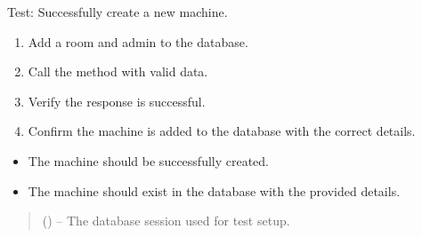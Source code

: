 \documentclass[letterpaper,10pt,english]{sphinxmanual}
\begin{document}
\begin{fulllineitems}
\label{\detokenize{test:test.test_machine.test_create_machine_success}}
\pysigstartsignatures
\pysiglinewithargsret
{}
{}
{}
\pysigstopsignatures
\sphinxAtStartPar
Test: Successfully create a new machine.
\begin{description}
\begin{enumerate}
%
\item {} 
\sphinxAtStartPar
Add a room and admin to the database.

\item {} 
\sphinxAtStartPar
Call the  method with valid data.

\item {} 
\sphinxAtStartPar
Verify the response is successful.

\item {} 
\sphinxAtStartPar
Confirm the machine is added to the database with the correct details.

\end{enumerate}

\begin{itemize}
\item {} 
\sphinxAtStartPar
The machine should be successfully created.

\item {} 
\sphinxAtStartPar
The machine should exist in the database with the provided details.

\end{itemize}

\end{description}
\begin{quote}\begin{description}
\sphinxAtStartPar
{} () – The database session used for test setup.

\end{description}\end{quote}

\end{fulllineitems}

\end{document}

